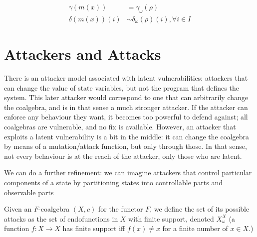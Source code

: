 

\begin{align}
\gamma(m(x))&=\gamma_\omega(\rho)\\
\delta(m(x))(i)&\sim \delta_\omega(\rho)(i), \forall i\in I
\end{align}


 
\section{Attackers and Attacks}
There is an attacker model associated with latent vulnerabilities: attackers that can change the value of state variables, but not the program that defines the system. This later attacker would correspond to one that can arbitrarily change the coalgebra, and is in that sense a much stronger attacker. If the attacker can enforce any behaviour they want, it becomes too powerful to defend against; all coalgebras are vulnerable, and no fix is available. However, an attacker that exploits a latent vulnerability is a bit in the middle: it can change the coalgebra by means of a mutation/attack function, but only through those. In that sense, not every behaviour is at the reach of the attacker, only those who are latent.

We can do a further refinement: we can imagine attackers that control particular components of a state by partitioning states into controllable parts and observable parts

\begin{definition}[Attack]
Given an $F$-coalgebra $(X,c)$ for the functor $F$, we define the set of its possible attacks as the set of endofunctions in $X$ with finite support, denoted $X^X_\omega$ (a function $f\colon X \rightarrow X$ has finite support iff $f(x)\neq x$ for a finite number of $x\in X$.)
\end{definition}

